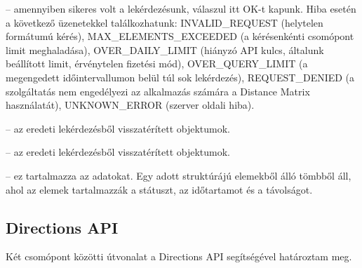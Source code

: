 \begin{description}
	\setlength{\itemsep}{0.04mm}
	\item[státusz] -- amennyiben sikeres volt a lekérdezésunk, válaszul itt OK-t kapunk. Hiba esetén a következő üzenetekkel találkozhatunk: INVALID\_REQUEST (helytelen formátumú kérés), MAX\_ELEMENTS\_EXCEEDED (a kérésenkénti csomópont limit meghaladása), OVER\_DAILY\_LIMIT (hiányzó API kulcs, általunk beállított limit, érvénytelen fizetési mód), OVER\_QUERY\_LIMIT (a megengedett időintervallumon belül túl sok lekérdezés), REQUEST\_DENIED (a szolgáltatás nem engedélyezi az alkalmazás számára a Distance Matrix használatát), UNKNOWN\_ERROR (szerver oldali hiba).
	\item[kiindulási pontok címei] -- az eredeti lekérdezésből visszatérített objektumok.
	\item[érkezési pontok címei] -- az eredeti lekérdezésből visszatérített objektumok.
	\item[sorok] -- ez tartalmazza az adatokat. Egy adott struktúrájú elemekből álló tömbből áll, ahol az elemek tartalmazzák a státuszt, az időtartamot és a távolságot.
\end{description}

\subsection{Directions API}

Két csomópont közötti útvonalat a Directions API segítségével határoztam meg.


